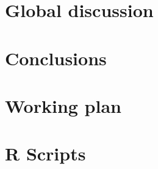 \documentclass[11pt]{article}
\begin{document}
\section{Global discussion}

\newpage

\section{Conclusions}

\newpage

\section{Working plan}

\newpage

\section{R Scripts}

\newpage
\end{document}
